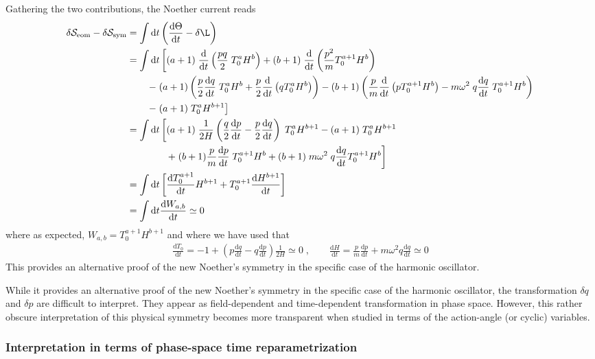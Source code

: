 \documentclass[onecolumn,notitlepage,superscriptaddress, nofootinbib,nobibnotes, aps,prd,10pt]{revtex4-1}%
\def\be{\begin{eqnarray}}
\def\ee{\end{eqnarray}}
\def\S{\mathcal{S}}
\def\nn{\nonumber}
\def\dd{\mathrm{d}}
\begin{document}
Gathering the two contributions, the Noether current reads
\begin{align}
\delta \S_{\text{eom}} - \delta \S_{\text{sym}} & = \int \dd t \left( \frac{\dd \Theta}{\dd t} - \delta \L \right)\\
&  = \int \dd t \left[ (a+1)\;  \frac{\dd}{\dd t} \left( \frac{pq}{2} \; T^a_0 H^b\right) + (b+1) \; \frac{\dd}{\dd t} \left( \frac{p^2}{m} T^{a+1}_0 H^b\right) \right. \nn \\
& \left. \qquad - \; (a+1) \left( \frac{p}{2} \frac{\dd q}{\dd t} \;  T^a_0 H^b + \frac{p}{2} \frac{\dd }{\dd t} \left( q T^a_0 H^b\right)\right) - (b+1) \left( \frac{p}{m} \frac{\dd}{\dd t} \left( p T^{a+1}_0 H^b\right) - m \omega^2 \; q \frac{\dd q}{\dd t} \; T^{a+1}_0 H^b \right) \right. \nn  \\
& \left. \qquad -  \; (a+1) \; T^a_0 H^{b+1}\right] \\
& = \int \dd t \left[ (a+1) \; \frac{1}{2H}\left( \frac{q}{2} \frac{\dd p}{\dd t}   - \frac{p}{2} \frac{\dd q}{\dd t} \right) \; T^a_0 H^{b+1} -  (a+1) \; T^a_0 H^{b+1} \right. \\
& \left. \qquad \qquad + \; (b+1) \frac{p}{m} \frac{\dd p}{\dd t} \; T^{a+1}_0 H^b + (b+1) \; m\omega^2 \; q \frac{\dd q}{\dd t} T^{a+1}_0 H^b \right] \\
& = \int \dd t \left[ \frac{\dd T^{a+1}_0}{\dd t} H^{b+1} + T^{a+1}_0 \frac{\dd H^{b+1}}{\dd t}\right] \\
& = \int \dd t \frac{\dd W_{a,b}}{\dd t} \simeq 0
\end{align}
where as expected, $W_{a,b} = T^{a+1}_0 H^{b+1}$ and where we have used that 
\be
\frac{\dd T_0}{\dd t} = - 1 + \left( p \frac{\dd q}{\dd t} - q \frac{\dd p}{\dd t}\right) \frac{1}{2H} \simeq 0\;, \qquad \frac{\dd H}{\dd t} = \frac{p}{m} \frac{\dd p}{\dd t} + m \omega^2 q \frac{\dd q}{\dd t} \simeq 0
\ee
This provides an alternative proof of the new Noether's symmetry in the specific case of the harmonic oscillator. 

While it provides an alternative proof of the new Noether's symmetry in the specific case of the harmonic oscillator, the transformation $\delta q$ and $\delta p$ are difficult to interpret. They appear as field-dependent and time-dependent transformation in phase space. However, this rather obscure interpretation of this physical symmetry becomes more transparent when studied in terms of the action-angle (or cyclic) variables.



\subsubsection{Interpretation in terms of phase-space time reparametrization }
\end{document}
